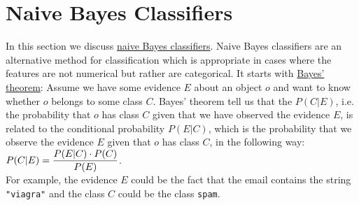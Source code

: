 \section{Naive Bayes Classifiers}
In this section we discuss \href{https://en.wikipedia.org/wiki/Naive_Bayes_classifier}{naive Bayes classifiers}.
Naive Bayes classifiers are an alternative method for classification which is appropriate in cases where the
features are not numerical but rather are categorical.  It starts with \href{https://en.wikipedia.org/wiki/Bayes%27_theorem}{Bayes' theorem}:
Assume we have some evidence $E$ about an object $o$ and want to know whether $o$ belongs to some class $C$.
Bayes' theorem tell us that the  $P(C|E)$, i.e. the probability that $o$ has class $C$
given that we have observed the evidence $E$, is related to the conditional probability $P(E|C)$, which is the probability that we
observe the evidence $E$ given that $o$ has class $C$, in the following way:
\\[0.2cm]
\hspace*{1.3cm}
$\displaystyle P(C|E) = \frac{P(E|C) \cdot P(C)}{P(E)}$.
\\[0.2cm]
For example, the evidence $E$ could be the fact that the email contains the string \texttt{"viagra"} and the
class $C$ could be the class \texttt{spam}.

